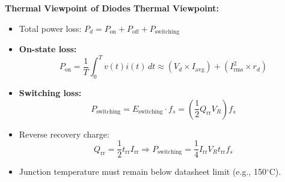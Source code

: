 \begin{frame}{\textbf{Thermal Viewpoint of Diodes}}
    \textbf{Thermal Viewpoint:}
    \begin{itemize}
        \item Total power loss: $P_d = P_{\text{on}} + P_{\text{off}} + P_{\text{switching}}$
        \item \textbf{On-state loss:}
        \begin{equation}
            P_{\text{on}} = \frac{1}{T} \int_0^T v(t)i(t)\, dt \approx (V_d \times I_{\text{avg}}) + (I_{\text{rms}}^2 \times r_d)
        \end{equation}
        \item \textbf{Switching loss:}
        \begin{equation}
            P_{\text{switching}} = E_{\text{switching}} \cdot f_s = \left( \frac{1}{2} Q_{\text{rr}} V_R \right) f_s
        \end{equation}
        \item Reverse recovery charge:
        \begin{equation}
            Q_{\text{rr}} = \frac{1}{2} t_{\text{rr}} I_{\text{rr}} \Rightarrow P_{\text{switching}} = \frac{1}{4} I_{\text{rr}} V_R t_{\text{rr}} f_s
        \end{equation}
        \item Junction temperature must remain below datasheet limit (e.g., 150$^\circ$C).
    \end{itemize}
\end{frame}


